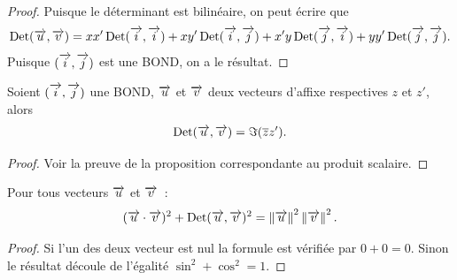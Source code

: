 \begin{proof}
  Puisque le déterminant est bilinéaire, on peut écrire que
  \begin{equation}
    \Det(\vu,\vv)=xx' \Det(\vi,\vi) + xy' \Det(\vi,\vj)+x'y\Det(\vj,\vi)+yy'\Det(\vj,\vj).
  \end{equation}
  Puisque \((\vi,\vj)\) est une BOND, on a le résultat.
\end{proof}
\begin{prop}
  Soient \((\vi,\vj)\) une BOND, \(\vu\) et \(\vv\) deux vecteurs d'affixe respectives \(z\) et \(z'\), alors 
\begin{equation}
  \Det(\vu,\vv)=\Im(\bar{z}z').
\end{equation}
\end{prop}
\begin{proof}
  Voir la preuve de la proposition correspondante au produit scalaire.
\end{proof}
\begin{prop}
  Pour tous vecteurs \(\vu\) et \(\vv\)~:
  \begin{equation}
    (\vu \cdot \vv)^2+\Det(\vu,\vv)^2=\norme{\vu}^2 \norme{\vv}^2.
  \end{equation}
\end{prop}
\begin{proof}
  Si l'un des deux vecteur est nul la formule est vérifiée par \(0+0=0\). Sinon le résultat découle de l'égalité \(\sin^2+\cos^2=1\).
\end{proof}

